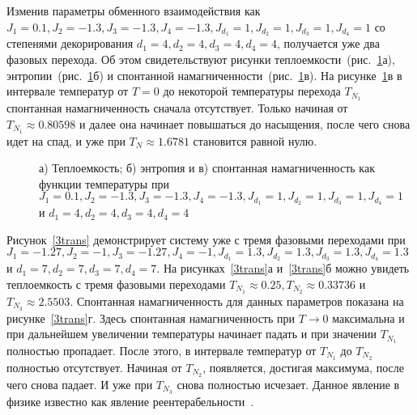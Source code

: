 Изменив параметры обменного взаимодействия как $J_1 = 0.1, J_2 = -1.3, J_3 = -1.3, J_4 = -1.3, J_{d_1} = 1, J_{d_2} = 1, J_{d_3} = 1, J_{d_4} = 1$ со степенями декорирования $d_1 = 4, d_2 = 4, d_3 = 4, d_4 = 4$, получается уже два фазовых перехода. Об этом свидетельствуют рисунки теплоемкости~(рис.~\ref{2trans}а), энтропии~(рис.~\ref{2trans}б) и спонтанной намагниченности~(рис.~\ref{2trans}в). На рисунке~\ref{2trans}в в интервале температур от $T = 0$ до некоторой температуры перехода $T_{N_1}$ спонтанная намагниченность сначала отсутствует. Только начиная от $T_{N_1} \approx 0.80598$ и далее она начинает повышаться до насыщения, после чего снова идет на спад, и уже при $T_N \approx 1.6781$ становится равной нулю. 

 \begin{figure}[h]
	\begin{minipage}{0.47\linewidth}
	\end{minipage}
	\hfill
	\begin{minipage}{0.47\linewidth}
	\end{minipage}
	\vfill
		\begin{minipage}{0.47\linewidth}
	\end{minipage}
	\caption{а) Теплоемкость; б) энтропия и в) спонтанная намагниченность как функции температуры при $J_1 = 0.1, J_2 = -1.3, J_3 = -1.3, J_4 = -1.3, J_{d_1} = 1, J_{d_2} = 1, J_{d_3} = 1, J_{d_4} = 1$ и $d_1 = 4, d_2 = 4, d_3 = 4, d_4 = 4$}
	\label{2trans}
\end{figure}

Рисунок~\ref{3trans} демонстрирует систему уже с тремя фазовыми переходами при $J_1 = -1.27, J_2 = -1, J_3 = -1.27, J_4 = -1, J_{d_1} = 1.3, J_{d_2} = 1.3, J_{d_3} = 1.3, J_{d_4} = 1.3$ и $d_1 = 7, d_2 = 7, d_3 = 7, d_4 = 7$. На рисунках~\ref{3trans}а и~\ref{3trans}б можно увидеть теплоемкость с тремя фазовыми переходами $T_{N_1} \approx 0.25, T_{N_2} \approx 0.33736$ и $T_{N_3} \approx 2.5503$. 
Спонтанная намагниченность для данных параметров показана на рисунке~\ref{3trans}г. Здесь спонтанная намагниченность при $T \rightarrow 0$ максимальна и при дальнейшем увеличении температуры начинает падать и при значении $T_{N_1}$ полностью пропадает. После этого, в интервале температур от $T_{N_1}$ до $T_{N_2}$ полностью отсутствует. Начиная от $T_{N_2}$, появляется, достигая максимума, после чего снова падает. И уже при $T_{N_3}$ снова полностью исчезает. Данное явление в физике известно как явление реентерабельности~\cite{vaks1966}. 

